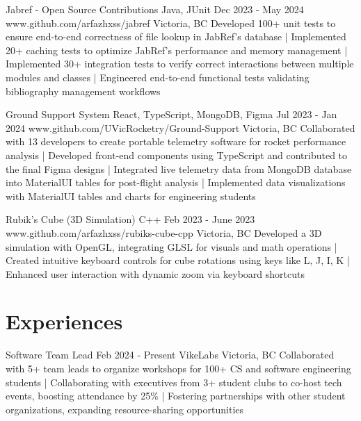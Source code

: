 \documentclass[a4paper,10pt]{article}
\begin{document}

\projectentry
{Jabref - Open Source Contributions}
{Java, JUnit}
{Dec 2023 - May 2024}
{www.github.com/arfazhxss/jabref}
{Victoria, BC}
{Developed 100+ unit tests to ensure end-to-end correctness of file lookup in JabRef's database
| Implemented 20+ caching tests to optimize JabRef's performance and memory management
| Implemented 30+ integration tests to verify correct interactions between multiple modules and classes
| Engineered end-to-end functional tests validating bibliography management workflows
}

\projectentry
{Ground Support System}
{React, TypeScript, MongoDB, Figma}
{Jul 2023 - Jan 2024}
{www.github.com/UVicRocketry/Ground-Support}
{Victoria, BC}
{Collaborated with 13 developers to create portable telemetry software for rocket performance analysis 
| Developed front-end components using TypeScript and contributed to the final Figma designs
| Integrated live telemetry data from MongoDB database into MaterialUI tables for post-flight analysis
| Implemented data visualizations with MaterialUI tables and charts for engineering students 
}

\projectentry
{Rubik's Cube (3D Simulation)}
{C++}
{Feb 2023 - June 2023}
{www.github.com/arfazhxss/rubiks-cube-cpp}
{Victoria, BC}
{Developed a 3D simulation with OpenGL, integrating GLSL for visuals and math operations 
| Created intuitive keyboard controls for cube rotations using keys like L, J, I, K 
| Enhanced user interaction with dynamic zoom via keyboard shortcuts
}

\section{Experiences}
\relevantexperience
{Software Team Lead}
{Feb 2024 - Present}
{VikeLabs}
{Victoria, BC}
{Collaborated with 5+ team leads to organize workshops for 100+ CS and software engineering students 
| Collaborating with executives from 3+ student clubs to co-host tech events, boosting attendance by 25\% 
| Fostering partnerships with other student organizations, expanding resource-sharing opportunities 
}
\end{document}
